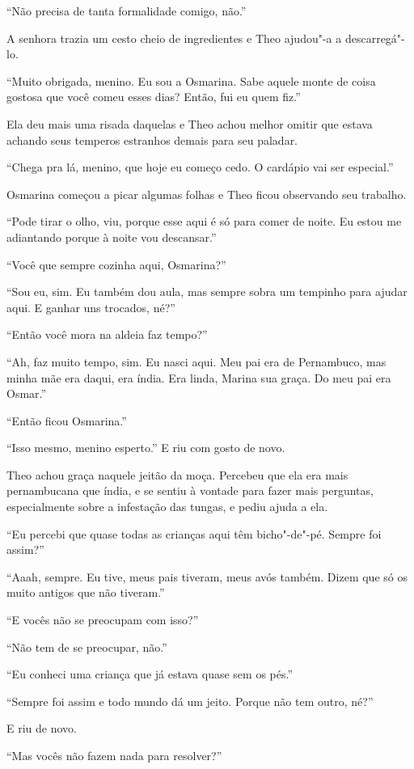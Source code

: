 ``Não precisa de tanta formalidade comigo, não.''

A senhora trazia um cesto cheio de ingredientes e Theo ajudou"-a a
descarregá"-lo.

``Muito obrigada, menino. Eu sou a Osmarina. Sabe aquele monte de coisa
gostosa que você comeu esses dias? Então, fui eu quem fiz.''

Ela deu mais uma risada daquelas e Theo achou melhor omitir que estava
achando seus temperos estranhos demais para seu paladar.

``Chega pra lá, menino, que hoje eu começo cedo. O cardápio vai ser
especial.''

Osmarina começou a picar algumas folhas e Theo ficou observando seu
trabalho.

``Pode tirar o olho, viu, porque esse aqui é só para comer de noite. Eu
estou me adiantando porque à noite vou descansar.''

``Você que sempre cozinha aqui, Osmarina?''

``Sou eu, sim. Eu também dou aula, mas sempre sobra um tempinho para
ajudar aqui. E ganhar uns trocados, né?''

``Então você mora na aldeia faz tempo?''

``Ah, faz muito tempo, sim. Eu nasci aqui. Meu pai era de Pernambuco,
mas minha mãe era daqui, era índia. Era linda, Marina sua graça. Do meu
pai era Osmar.''

``Então ficou Osmarina.''

``Isso mesmo, menino esperto.'' E riu com gosto de novo.

Theo achou graça naquele jeitão da moça. Percebeu que ela era mais
pernambucana que índia, e se sentiu à vontade para fazer mais perguntas,
especialmente sobre a infestação das tungas, e pediu ajuda a ela.

``Eu percebi que quase todas as crianças aqui têm bicho"-de"-pé. Sempre
foi assim?''

``Aaah, sempre. Eu tive, meus pais tiveram, meus avós também. Dizem que
só os muito antigos que não tiveram.''

``E vocês não se preocupam com isso?''

``Não tem de se preocupar, não.''

``Eu conheci uma criança que já estava quase sem os pés.''

``Sempre foi assim e todo mundo dá um jeito. Porque não tem outro, né?''

E riu de novo.

``Mas vocês não fazem nada para resolver?''

